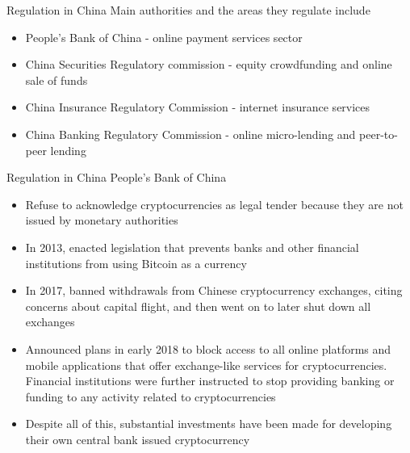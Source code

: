 \documentclass[10pt]{beamer}
\begin{document}

\begin{frame}{Regulation in China}
	Main authorities and the areas they regulate include
	\begin{itemize}
		\item People's Bank of China - online payment services sector
		\item China Securities Regulatory commission - equity crowdfunding and online sale of funds
		\item China Insurance Regulatory Commission - internet insurance services
		\item China Banking Regulatory Commission - online micro-lending and peer-to-peer lending
	\end{itemize}
\end{frame}


\begin{frame}{Regulation in China}
	People's Bank of China
	\begin{itemize}
		\item Refuse to acknowledge cryptocurrencies as legal tender because they are not issued by monetary authorities
		\item In 2013, enacted legislation that prevents banks and other financial institutions from using Bitcoin as a currency
		\item In 2017, banned withdrawals from Chinese cryptocurrency exchanges, citing concerns about capital flight, and then went on to later shut down all exchanges
		\item Announced plans in early 2018 to block access to all online platforms and mobile applications that offer exchange-like services for cryptocurrencies. Financial institutions were further instructed to stop providing banking or funding to any activity related to cryptocurrencies
		\item Despite all of this, substantial investments have been made for developing their own central bank issued cryptocurrency
	\end{itemize}
\end{frame}

\end{document}
